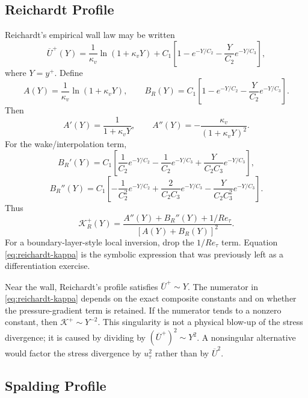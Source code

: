\documentclass[11pt]{article}
\newcommand{\Ut}{\overline{U}}
\newcommand{\Ret}{Re_\tau}
\newcommand{\kapg}{\mathcal{K}}
\newcommand{\kapv}{\kappa_v}
\begin{document}
\subsection{Reichardt Profile}
\label{sec:reichardt}

Reichardt's empirical wall law may be written
\begin{equation}
\Ut^+(Y)=\frac{1}{\kapv}\ln(1+\kapv Y)+C_1\left[1-e^{-Y/C_2}-\frac{Y}{C_2}e^{-Y/C_3}\right],
\label{eq:reichardt}
\end{equation}
where $Y=y^+$. Define
\begin{equation}
A(Y)=\frac{1}{\kapv}\ln(1+\kapv Y),\qquad
B_R(Y)=C_1\left[1-e^{-Y/C_2}-\frac{Y}{C_2}e^{-Y/C_3}\right].
\end{equation}
Then
\begin{equation}
A'(Y)=\frac{1}{1+\kapv Y},\qquad
A''(Y)=-\frac{\kapv}{(1+\kapv Y)^2}.
\end{equation}
For the wake/interpolation term,
\begin{equation}
B_R'(Y)=C_1\left[\frac{1}{C_2}e^{-Y/C_2}-\frac{1}{C_2}e^{-Y/C_3}+\frac{Y}{C_2C_3}e^{-Y/C_3}\right],
\end{equation}
\begin{equation}
B_R''(Y)=C_1\left[-\frac{1}{C_2^2}e^{-Y/C_2}+\frac{2}{C_2C_3}e^{-Y/C_3}-\frac{Y}{C_2C_3^2}e^{-Y/C_3}\right].
\end{equation}
Thus
\begin{equation}
\boxed{\;\kapg_R^+(Y)=\frac{A''(Y)+B_R''(Y)+1/\Ret}{\left[A(Y)+B_R(Y)\right]^2}.\;}
\label{eq:reichardt-kappa}
\end{equation}
For a boundary-layer-style local inversion, drop the $1/\Ret$ term. Equation \eqref{eq:reichardt-kappa} is the symbolic expression that was previously left as a differentiation exercise.

Near the wall, Reichardt's profile satisfies $\Ut^+\sim Y$. The numerator in \eqref{eq:reichardt-kappa} depends on the exact composite constants and on whether the pressure-gradient term is retained. If the numerator tends to a nonzero constant, then $\kapg^+\sim Y^{-2}$. This singularity is not a physical blow-up of the stress divergence; it is caused by dividing by $(\Ut^+)^2\sim Y^2$. A nonsingular alternative would factor the stress divergence by $u_\tau^2$ rather than by $\Ut^2$.

\subsection{Spalding Profile}
\end{document}

